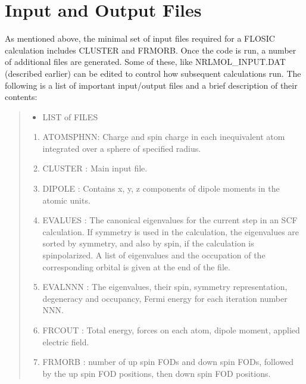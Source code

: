 \documentclass[letterpaper,10pt,english,openany,oneside]{sphinxmanual}
\begin{document}
\chapter{Input and Output Files}
\label{\detokenize{docs/files:input-and-output-files}}\label{\detokenize{docs/files:nrlmolfiles}}\label{\detokenize{docs/files::doc}}
\sphinxAtStartPar
As mentioned above, the minimal set of input files required for a FLOSIC calculation includes CLUSTER and FRMORB.
Once the code is run, a number of additional files are generated. Some of these, like NRLMOL\_INPUT.DAT (described earlier) can be edited to control how subsequent calculations run. The following is a list of important input/output files and a brief description of their contents:
\begin{quote}
\begin{itemize}
\item {} 
\sphinxAtStartPar
LIST of FILES

\end{itemize}
\begin{enumerate}
%
\item {} 
\sphinxAtStartPar
ATOMSPHNN: Charge and spin charge in each inequivalent atom integrated over a sphere of
specified  radius.

\item {} 
\sphinxAtStartPar
CLUSTER  : Main input file.

\item {} 
\sphinxAtStartPar
DIPOLE  : Contains x, y, z components of dipole moments in the atomic units.

\item {} 
\sphinxAtStartPar
EVALUES : The canonical eigenvalues for the current step in an SCF calculation.
If symmetry is used in the calculation, the eigenvalues are sorted by symmetry, and also by spin, if the calculation is spin\sphinxhyphen{}polarized.
A list of eigenvalues and the occupation of the corresponding orbital is given at the end of the file.

\item {} 
\sphinxAtStartPar
EVALNNN : The eigenvalues, their spin, symmetry representation, degeneracy and occupancy,
Fermi energy for each iteration number NNN.

\item {} 
\sphinxAtStartPar
FRCOUT   : Total energy, forces on each atom, dipole moment, applied electric field.

\item {} 
\sphinxAtStartPar
FRMORB : number of up spin FODs and down spin FODs, followed by the up spin FOD positions, then down spin FOD positions.


\end{enumerate}
\end{quote}
\end{document}
